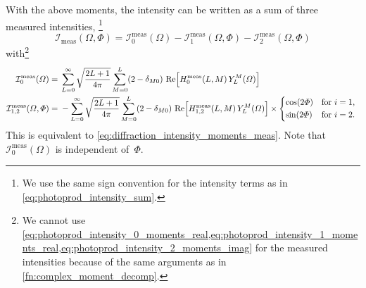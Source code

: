 With the above moments, the intensity can be written as a sum of three
measured intensities, \ie\footnote{We use the same sign convention for
the intensity terms as in \cref{eq:photoprod_intensity_sum}.}
\begin{equation}
  \mathcal{I}_\text{meas}(\Omega, \Phi)
  = \mathcal{I}_0^\text{meas}(\Omega) - \mathcal{I}_1^\text{meas}(\Omega, \Phi) - \mathcal{I}_2^\text{meas}(\Omega, \Phi)
\end{equation}
with\footnote{We cannot use
\cref{eq:photoprod_intensity_0_moments_real,eq:photoprod_intensity_1_moments_real,eq:photoprod_intensity_2_moments_imag}
for the measured intensities because of the same arguments as in
\cref{fn:complex_moment_decomp}.}
\begin{align}
  \mathcal{I}_0^\text{meas}(\Omega)
  ={}& \sum_{L = 0}^\infty \sqrt{\frac{2 L + 1}{4 \pi}} \sum_{M = 0}^{L} (2 - \delta_{M 0})\,
  \Re{H_0^\text{meas}(L, M)\, Y_L^M(\Omega)}
  \\
  \mathcal{I}_{1, 2}^\text{meas}(\Omega, \Phi)
  ={}& -\sum_{L = 0}^\infty \sqrt{\frac{2 L + 1}{4 \pi}} \sum_{M = 0}^{L} (2 - \delta_{M 0})\,
  \Re{H_{1, 2}^\text{meas}(L, M)\, Y_L^M(\Omega)} \times \begin{cases*}
    \cos(2 \Phi) & for $i = 1$, \\
    \sin(2 \Phi) & for $i = 2$.
  \end{cases*}
\end{align}
This is equivalent to \cref{eq:diffraction_intensity_moments_meas}.
Note that $\mathcal{I}_0^\text{meas}(\Omega)$ is independent
of~$\Phi$.


